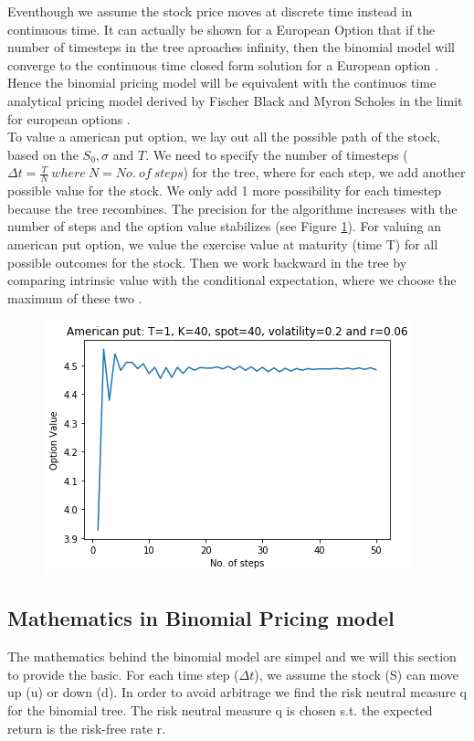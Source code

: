 Eventhough we assume the stock price moves at discrete time instead in continuous time. It can actually be shown for a European Option that if the number of timesteps in the tree aproaches infinity, then the binomial model will converge to the continuous time closed form solution for a European option \parencite{binomial-Paper} \parencite{Hull}. Hence the binomial pricing model will be equivalent with the continuos time analytical pricing model derived by Fischer Black and Myron Scholes in the limit for european options \parencite{binomial-Paper}.\\

To value a american put option, we lay out all the possible path of the stock, based on the $S_0,\sigma$ and $T$. We need to specify the number of timesteps ($\Delta t = \frac{T}{N} \ where \ N=No. \ of  \ steps$) for the tree, where for each step, we add another possible value for the stock. We only add 1 more possibility for each timestep because the tree recombines. The precision for the algorithme increases with the number of steps and the option value stabilizes (see Figure \ref{fig:binConv}). For valuing an american put option, we value the exercise value at maturity (time T) for all possible outcomes for the stock. Then we work backward in the tree by comparing intrinsic value with the conditional expectation, where we choose the maximum of these two \parencite{Hull}. 
 
\begin{figure}[th]
\centering
\includegraphics{Figures/binConv.png}
\decoRule
\caption[Convergence of Binomial model]{}
\label{fig:binConv}
\end{figure}



\subsection{Mathematics in Binomial Pricing model}
The mathematics behind the binomial model are simpel and we will this section to provide the basic. For each time step ($\Delta t$), we assume the stock (S) can move up (u) or down (d). In order to avoid arbitrage we find the risk neutral measure q for the binomial tree. The risk neutral measure q is chosen s.t. the expected return is the risk-free rate r.

